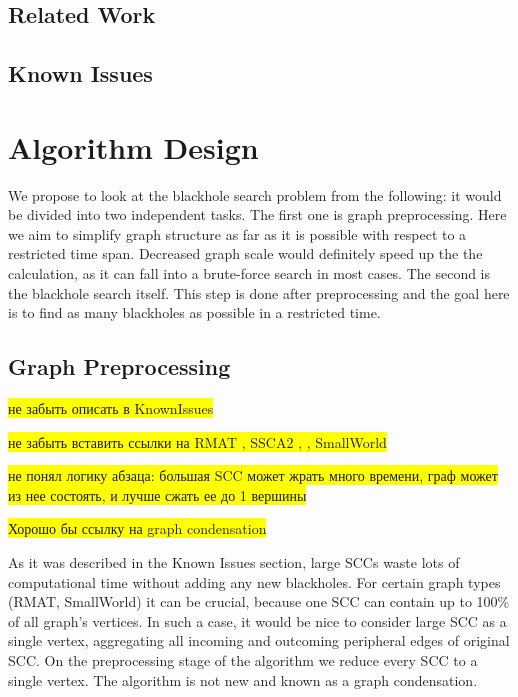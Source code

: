 \documentclass{svproc}
\newcommand{\FIXME}[1]{ %
	\colorbox{yellow}{#1}
}
\newcommand{\FIXME}[1]{ %
}
\begin{document}
%
\subsection{Related Work}
\cite{li2010detecting,li2012mining,li2014mining,hong2015detecting}

%
\subsection{Known Issues}
%

%
\section{Algorithm Design}
We propose to look at the blackhole search problem from the following: it would be divided into two independent tasks. 
The first one is graph preprocessing. Here we aim to simplify graph structure as far as it is possible with respect to a restricted time span. 
Decreased graph scale would definitely speed up the the calculation, as it can fall into a brute-force search in most cases.
The second is the blackhole search itself. This step is done after preprocessing and the goal here is to find as many blackholes as possible in a restricted time.
%

%
\subsection{Graph Preprocessing}
\FIXME{не забыть описать в KnownIssues}

\FIXME{не забыть вставить ссылки на RMAT \cite{chakrabarti2004r}, SSCA2 \cite{bader2005design}, \cite{random-uniform}, SmallWorld \cite{watts1999networks}}

\FIXME{не понял логику абзаца: большая SCC может жрать много времени, граф может из нее состоять, и лучше сжать ее до 1 вершины}

\FIXME{Хорошо бы ссылку на graph condensation}

As it was described in the Known Issues section, large SCCs waste lots of computational time without adding any new blackholes. 
For certain graph types (RMAT, SmallWorld) it can be crucial, because one SCC can contain up to 100\% of all graph's vertices. 
In such a case, it would be nice to consider large SCC as a single vertex, aggregating all incoming and outcoming peripheral edges
of original SCC.
On the preprocessing stage of the algorithm we reduce every SCC to a single vertex. The algorithm is not new and known as a graph condensation.
\end{document}
